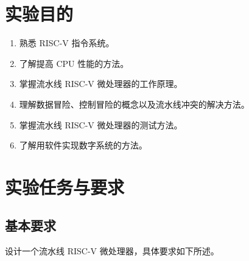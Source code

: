 \documentclass[12pt,hyperref,a4paper,UTF8]{ctexart}
\begin{document}
\cover

%
%

\thispagestyle{empty} %

\newpage
\tableofcontents

\newpage


\section{实验目的}
\begin{enumerate}
  \item 熟悉 RISC-V 指令系统。
  \item 了解提高 CPU 性能的方法。
  \item 掌握流水线 RISC-V 微处理器的工作原理。
  \item 理解数据冒险、控制冒险的概念以及流水线冲突的解决方法。
  \item 掌握流水线 RISC-V 微处理器的测试方法。
  \item 了解用软件实现数字系统的方法。
\end{enumerate}



\section{实验任务与要求}
\subsection*{基本要求}

设计一个流水线 RISC-V 微处理器，具体要求如下所述。
\end{document}
